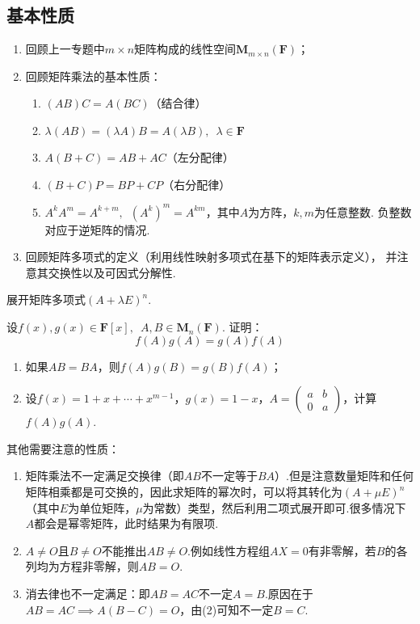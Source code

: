 \subsection{基本性质}
\begin{enumerate}
    \item 回顾上一专题中$m \times n$矩阵构成的线性空间$\mathbf{M}_{m \times n}(\mathbf{F})$；
    \item 回顾矩阵乘法的基本性质：
    \begin{enumerate}[label=(\arabic*)]
        \item $(AB)C=A(BC)$（结合律）
        \item $\lambda(AB)=(\lambda A)B=A(\lambda B),\enspace \lambda \in \mathbf{F}$
        \item $A(B+C)=AB+AC$（左分配律）
        \item $(B+C)P=BP+CP$（右分配律）
        \item $A^kA^m=A^{k+m},\enspace (A^k)^m=A^{km}$，其中$A$为方阵，$k,m$为任意整数. 负整数对应于逆矩阵的情况.
    \end{enumerate}
    \item 回顾矩阵多项式的定义（利用线性映射多项式在基下的矩阵表示定义），
    并注意其交换性以及可因式分解性.
\end{enumerate}
\begin{example}
    展开矩阵多项式$(A+\lambda E)^n$.
\end{example}
\begin{example}
    设$f(x),g(x) \in \mathbf{F}[x],\enspace A,B \in \mathbf{M}_n(\mathbf{F})$. 证明：
    \[f(A)g(A)=g(A)f(A)\]
    \begin{enumerate}
        \item 如果$AB=BA$，则$f(A)g(B)=g(B)f(A)$；

        \item 设$f(x)=1+x+\cdots+x^{m-1}$，$g(x)=1-x$，$A=\begin{pmatrix}
            a & b \\ 0 & a
        \end{pmatrix}$，计算$f(A)g(A)$.
    \end{enumerate}
\end{example}
其他需要注意的性质：
\begin{enumerate}
    \item 矩阵乘法不一定满足交换律（即$AB$不一定等于$BA$）.但是注意数量矩阵和任何矩阵相乘都是可交换的，因此求矩阵的幂次时，可以将其转化为$(A+\mu E)^n$（其中$E$为单位矩阵，$\mu$为常数）类型，然后利用二项式展开即可.很多情况下$A$都会是幂零矩阵，此时结果为有限项.
    \item $A\neq O$且$B\neq O$不能推出$AB\neq O$.例如线性方程组$AX = 0$有非零解，若$B$的各列均为方程非零解，则$AB = O$.
    \item 消去律也不一定满足：即$AB = AC$不一定$A = B$.原因在于$AB=AC \implies A(B-C)=O$，由(2)可知不一定$B = C$.
\end{enumerate}

